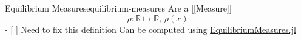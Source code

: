 \begin{definition}{Equilibrium Measures}{equilibrium-measures}
  Are a {[}{[}Measure{]}{]}
  \[\rho: \mathbb{R} \mapsto \mathbb{R},\, \rho(x)\] - {[} {]} Need to fix
  this definition Can be computed using
  \href{https://github.com/JuliaApproximation/EquilibriumMeasures.jl}{EquilibriumMeasures.jl}
\end{definition}
